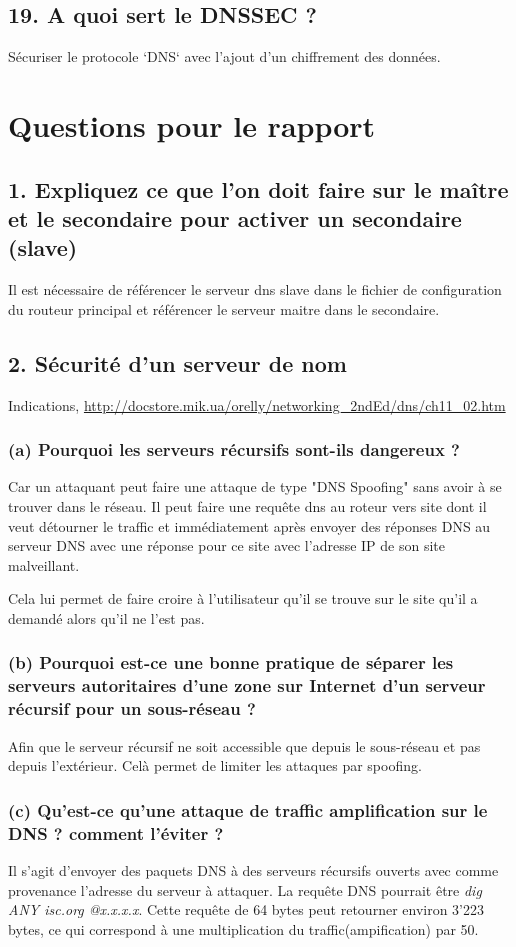 \documentclass{article}
\begin{document}
\subsection*{19. A quoi sert le DNSSEC ?}
Sécuriser le protocole `DNS` avec l'ajout d'un chiffrement des données.

\section{Questions pour le rapport}
\subsection*{1. Expliquez ce que l’on doit faire sur le maître et le secondaire pour activer un secondaire (slave)}
Il est nécessaire de référencer le serveur dns slave dans le fichier de configuration du routeur principal et référencer le serveur maitre dans le secondaire.

\subsection*{2. Sécurité d’un serveur de nom}
Indications,  \url{http://docstore.mik.ua/orelly/networking_2ndEd/dns/ch11_02.htm}

\subsubsection*{(a) Pourquoi les serveurs récursifs sont-ils dangereux ?}
Car un attaquant peut faire une attaque de type "DNS Spoofing" sans avoir à se trouver dans le réseau. Il peut faire une requête dns au roteur vers site dont il veut détourner le traffic et immédiatement après envoyer des réponses DNS au serveur DNS avec une réponse pour ce site avec l'adresse IP de son site malveillant.

Cela lui permet de faire croire à l'utilisateur qu'il se trouve sur le site qu'il a demandé alors qu'il ne l'est pas.

\subsubsection*{(b) Pourquoi est-ce une bonne pratique de séparer les serveurs autoritaires d’une zone sur Internet d’un serveur récursif pour un sous-réseau ?}
Afin que le serveur récursif ne soit accessible que depuis le sous-réseau et pas depuis l'extérieur. Celà permet de limiter les attaques par spoofing.

\subsubsection*{(c) Qu’est-ce qu’une attaque de traffic amplification sur le DNS ? comment l’éviter ?}
Il s'agit d'envoyer des paquets DNS à des serveurs récursifs ouverts avec comme provenance l'adresse du serveur à attaquer. La requête DNS pourrait être \textit{dig ANY isc.org @x.x.x.x}. Cette requête de 64 bytes peut retourner environ 3'223 bytes, ce qui correspond à une multiplication du  traffic(ampification) par 50.\\
\end{document}
